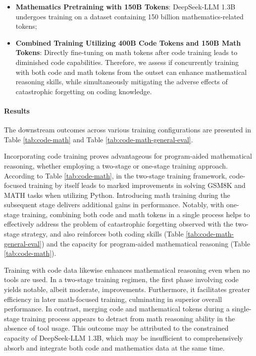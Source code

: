 \begin{itemize}[topsep=0pt]
\begin{itemize}[topsep=0pt]
\begin{itemize}[topsep=0pt]
    \item \textbf{Mathematics Pretraining with 150B Tokens}: DeepSeek-LLM 1.3B undergoes training on a dataset containing 150 billion mathematics-related tokens;
    \item \textbf{Combined Training Utilizing 400B Code Tokens and 150B Math Tokens}: Directly fine-tuning on math tokens after code training leads to diminished code capabilities. Therefore, we assess if concurrently training with both code and math tokens from the outset can enhance mathematical reasoning skills, while simultaneously mitigating the adverse effects of catastrophic forgetting on coding knowledge.
\end{itemize}

\paragraph{Results}
The downstream outcomes across various training configurations are presented in Table \ref{tab:code-math} and Table \ref{tab:code-math-general-eval}.

Incorporating code training proves advantageous for program-aided mathematical reasoning, whether employing a two-stage or one-stage training approach. According to Table \ref{tab:code-math}, in the two-stage training framework, code-focused training by itself leads to marked improvements in solving GSM8K and MATH tasks when utilizing Python. Introducing math training during the subsequent stage delivers additional gains in performance. Notably, with one-stage training, combining both code and math tokens in a single process helps to effectively address the problem of catastrophic forgetting observed with the two-stage strategy, and also reinforces both coding skills (Table \ref{tab:code-math-general-eval}) and the capacity for program-aided mathematical reasoning (Table \ref{tab:code-math}).

Training with code data likewise enhances mathematical reasoning even when no tools are used. In a two-stage training regimen, the first phase involving code yields notable, albeit moderate, improvements. Furthermore, it facilitates greater efficiency in later math-focused training, culminating in superior overall performance. In contrast, merging code and mathematical tokens during a single-stage training process appears to detract from math reasoning ability in the absence of tool usage. This outcome may be attributed to the constrained capacity of DeepSeek-LLM 1.3B, which may be insufficient to comprehensively absorb and integrate both code and mathematics data at the same time.


\end{itemize}
\end{itemize}
